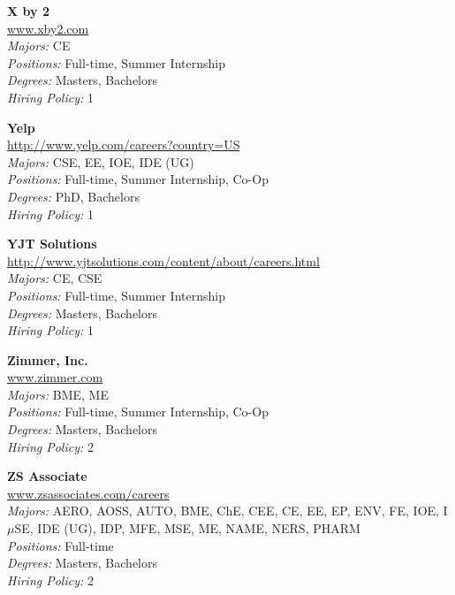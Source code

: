 \documentclass[twoside]{article}
\begin{document}
\begin{center}
\begin{multicols}{3}
\begin{minipage}{.9\columnwidth}{\Large\bf X by 2 }\\
	\url{www.xby2.com}\\
	\emph{Majors:} CE\\
	\emph{Positions:} Full-time, Summer Internship\\
	\emph{Degrees:} Masters, Bachelors\\
	\emph{Hiring Policy:} 1\\
\end{minipage}
 
\begin{minipage}{.9\columnwidth}{\Large\bf Yelp }\\
	\url{http://www.yelp.com/careers?country=US}\\
	\emph{Majors:} CSE, EE, IOE, IDE (UG)\\
	\emph{Positions:} Full-time, Summer Internship, Co-Op\\
	\emph{Degrees:} PhD, Bachelors\\
	\emph{Hiring Policy:} 1\\
\end{minipage}
 
\begin{minipage}{.9\columnwidth}{\Large\bf YJT Solutions }\\
	\url{http://www.yjtsolutions.com/content/about/careers.html}\\
	\emph{Majors:} CE, CSE\\
	\emph{Positions:} Full-time, Summer Internship\\
	\emph{Degrees:} Masters, Bachelors\\
	\emph{Hiring Policy:} 1\\
\end{minipage}
 
\begin{minipage}{.9\columnwidth}{\Large\bf Zimmer, Inc. }\\
	\url{www.zimmer.com}\\
	\emph{Majors:} BME, ME\\
	\emph{Positions:} Full-time, Summer Internship, Co-Op\\
	\emph{Degrees:} Masters, Bachelors\\
	\emph{Hiring Policy:} 2\\
\end{minipage}
 
\begin{minipage}{.9\columnwidth}{\Large\bf ZS Associate }\\
	\url{www.zsassociates.com/careers}\\
	\emph{Majors:} AERO, AOSS, AUTO, BME, ChE, CEE, CE, EE, EP, ENV, FE, IOE, I$\mu$SE, IDE (UG), IDP, MFE, MSE, ME, NAME, NERS, PHARM\\
	\emph{Positions:} Full-time\\
	\emph{Degrees:} Masters, Bachelors\\
	\emph{Hiring Policy:} 2\\
\end{minipage}
 

\end{multicols}
\end{center}
\end{document}
